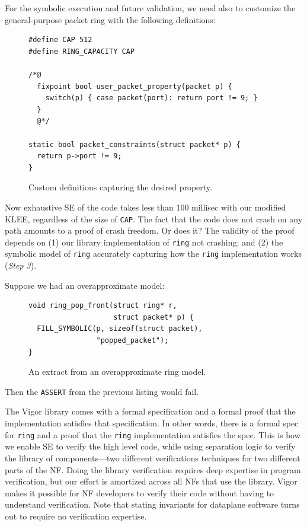 \documentclass[letterpaper,twocolumn,10pt]{article}
\newcommand{\code}[1]{\lstinline{#1}}
\begin{document}
For the symbolic execution and future validation, we need also to customize the
general-purpose packet ring with the following definitions:

\begin{figure}
\begin{lstlisting}
#define CAP 512
#define RING_CAPACITY CAP

/*@
  fixpoint bool user_packet_property(packet p) {
    switch(p) { case packet(port): return port != 9; }
  }
  @*/

static bool packet_constraints(struct packet* p) {
  return p->port != 9;
}
\end{lstlisting}
  \caption{Custom definitions capturing the desired property.}
  \label{lst:customizations}
\end{figure}

Now exhaustive SE of the code takes less than 100 millisec with our modified
KLEE, regardless of the size of \code{CAP}.  The fact that the code does not
crash on any path amounts to a proof of crash freedom. Or does it? The validity
of the proof depends on (1)  our library implementation of \code{ring} not
crashing; and (2) the symbolic model of \code{ring} accurately capturing how the
\code{ring} implementation works ({\em Step 3}).

Suppose we had an overapproximate model:
\begin{figure}[h!]
\begin{lstlisting}
void ring_pop_front(struct ring* r,
                    struct packet* p) {
  FILL_SYMBOLIC(p, sizeof(struct packet),
                "popped_packet");
}
\end{lstlisting}
  \caption{An extract from an overapproximate ring model.}
  \label{lst:overapproximate}
\end{figure}
Then the \code{ASSERT} from the previous listing would fail.

The Vigor library comes with a formal specification and a formal proof that the
implementation satisfies that specification. In other words, there is a formal
spec for \code{ring} and a proof that the \code{ring} implementation satisfies
the spec. This is how we enable SE to verify the high level code, while using
separation logic to verify the library of components---two different
verifications techniques for two different parts of the NF. Doing the library
verification requires deep expertise in program verification, but our effort is
amortized across all NFs that use the library. Vigor makes it possible for NF
developers to verify their code without having to understand verification. Note
that stating invariants for dataplane software turns out to require no
verification expertise.
\end{document}
